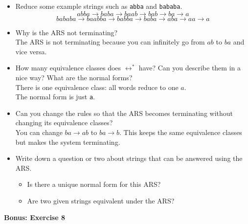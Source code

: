 \documentclass{article}
\theoremstyle{theorem}
\theoremstyle{definition}
\theoremstyle{remark}
\begin{document}
\begin{itemize}
    \item Reduce some example strings such as \texttt{abba} and \texttt{bababa}.
    \[
    abba \to baba \to baab \to bab \to ba \to a
    \]
    \[
    bababa \to baabba \to babba \to baba \to aba \to aa \to a
    \]

    \item Why is the ARS not terminating? \\
    The ARS is not terminating because you can infinitely go from $ab$ to $ba$ and vice versa.

    \item How many equivalence classes does $\leftrightarrow^*$ have? Can you describe them in a nice way? What are the normal forms? \\
    There is one equivalence class: all words reduce to one $a$. \\
    The normal form is just \texttt{a}.

    \item Can you change the rules so that the ARS becomes terminating without changing its equivalence classes? \\
    You can change $ba \to ab$ to $ba \to b$. This keeps the same equivalence classes but makes the system terminating.

    \item Write down a question or two about strings that can be answered using the ARS. \\
    \begin{itemize}
        \item Is there a unique normal form for this ARS?
        \item Are two given strings equivalent under the ARS?
    \end{itemize}
\end{itemize}


\textbf{Bonus: Exercise 8}
\end{document}
